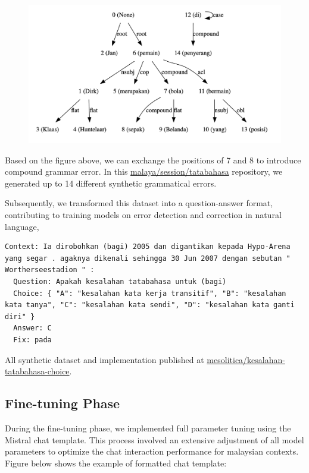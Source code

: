 \documentclass[preprint]{article}
\begin{document}
\begin{figure}[h]
  \centering
  \includegraphics[width=0.6\linewidth]{img/dependency.png} %
\end{figure}

Based on the figure above, we can exchange the positions of 7 and 8 to introduce compound grammar error. In this \href{https://github.com/mesolitica/malaya/tree/master/session/tatabahasa/prepare-dataset}{malaya/session/tatabahasa} repository, we generated up to 14 different synthetic grammatical errors.

Subsequently, we transformed this dataset into a question-answer format, contributing to training models on error detection and correction in natural language,

\begin{lstlisting}[breaklines=true]
  Context: Ia dirobohkan (bagi) 2005 dan digantikan kepada Hypo-Arena yang segar . agaknya dikenali sehingga 30 Jun 2007 dengan sebutan " Wortherseestadion " :
  Question: Apakah kesalahan tatabahasa untuk (bagi)
  Choice: { "A": "kesalahan kata kerja transitif", "B": "kesalahan kata tanya", "C": "kesalahan kata sendi", "D": "kesalahan kata ganti diri" }
  Answer: C
  Fix: pada
\end{lstlisting}

All synthetic dataset and implementation published at \href{https://huggingface.co/datasets/mesolitica/kesalahan-tatabahasa-choice}{mesolitica/kesalahan-tatabahasa-choice}.

\subsection{Fine-tuning Phase}

During the fine-tuning phase, we implemented full parameter tuning using the Mistral chat template. This process involved an extensive adjustment of all model parameters to optimize the chat interaction performance for malaysian contexts. Figure below shows the example of formatted chat template:
\end{document}
